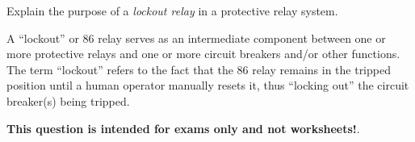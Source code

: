 

Explain the purpose of a {\it lockout relay} in a protective relay system.







A ``lockout'' or 86 relay serves as an intermediate component between one or more protective relays and one or more circuit breakers and/or other functions.  The term ``lockout'' refers to the fact that the 86 relay remains in the tripped position until a human operator manually resets it, thus ``locking out'' the circuit breaker(s) being tripped.







{\bf This question is intended for exams only and not worksheets!}.



